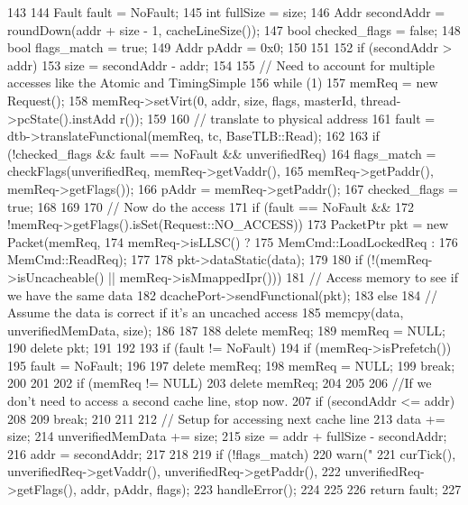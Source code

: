 \begin{DoxyCode}
143 {
144     Fault fault = NoFault;
145     int fullSize = size;
146     Addr secondAddr = roundDown(addr + size - 1, cacheLineSize());
147     bool checked_flags = false;
148     bool flags_match = true;
149     Addr pAddr = 0x0;
150 
151 
152     if (secondAddr > addr)
153        size = secondAddr - addr;
154 
155     // Need to account for multiple accesses like the Atomic and TimingSimple
156     while (1) {
157         memReq = new Request();
158         memReq->setVirt(0, addr, size, flags, masterId, thread->pcState().instAdd
      r());
159 
160         // translate to physical address
161         fault = dtb->translateFunctional(memReq, tc, BaseTLB::Read);
162 
163         if (!checked_flags && fault == NoFault && unverifiedReq) {
164             flags_match = checkFlags(unverifiedReq, memReq->getVaddr(),
165                                      memReq->getPaddr(), memReq->getFlags());
166             pAddr = memReq->getPaddr();
167             checked_flags = true;
168         }
169 
170         // Now do the access
171         if (fault == NoFault &&
172             !memReq->getFlags().isSet(Request::NO_ACCESS)) {
173             PacketPtr pkt = new Packet(memReq,
174                                        memReq->isLLSC() ?
175                                        MemCmd::LoadLockedReq :
176                                        MemCmd::ReadReq);
177 
178             pkt->dataStatic(data);
179 
180             if (!(memReq->isUncacheable() || memReq->isMmappedIpr())) {
181                 // Access memory to see if we have the same data
182                 dcachePort->sendFunctional(pkt);
183             } else {
184                 // Assume the data is correct if it's an uncached access
185                 memcpy(data, unverifiedMemData, size);
186             }
187 
188             delete memReq;
189             memReq = NULL;
190             delete pkt;
191         }
192 
193         if (fault != NoFault) {
194             if (memReq->isPrefetch()) {
195                 fault = NoFault;
196             }
197             delete memReq;
198             memReq = NULL;
199             break;
200         }
201 
202         if (memReq != NULL) {
203             delete memReq;
204         }
205 
206         //If we don't need to access a second cache line, stop now.
207         if (secondAddr <= addr)
208         {
209             break;
210         }
211 
212         // Setup for accessing next cache line
213         data += size;
214         unverifiedMemData += size;
215         size = addr + fullSize - secondAddr;
216         addr = secondAddr;
217     }
218 
219     if (!flags_match) {
220         warn("%
221              curTick(), unverifiedReq->getVaddr(), unverifiedReq->getPaddr(),
222              unverifiedReq->getFlags(), addr, pAddr, flags);
223         handleError();
224     }
225 
226     return fault;
227 }
\end{DoxyCode}
